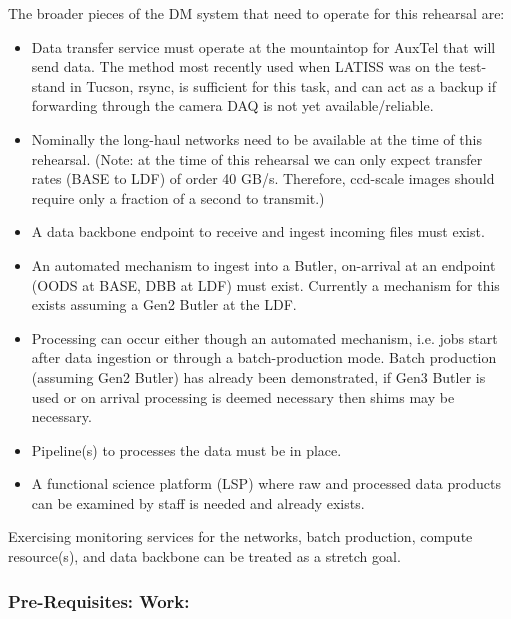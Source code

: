 The broader pieces of the DM system that need to operate for this rehearsal are:
\begin{itemize}[topsep=-8pt]
\item Data transfer service must operate at the mountaintop for AuxTel that will send data.
The method most recently used when LATISS was on the test-stand in Tucson, rsync, is 
sufficient for this task, and can act as a backup if forwarding through the camera DAQ is 
not yet available/reliable.

\item  Nominally the long-haul networks need to be available at the time of this rehearsal.
(Note: at the time of this rehearsal we can only expect transfer rates (BASE to LDF)
of order 40 GB/s.  Therefore, ccd-scale images should require only a fraction of a second to 
transmit.)

\item A data backbone endpoint to receive and ingest incoming files must exist.

\item An automated mechanism to ingest into a Butler, on-arrival at an endpoint (OODS at BASE, DBB at LDF)
must exist.  Currently a mechanism for this exists assuming a Gen2 Butler at the LDF.

\item Processing can occur either though an automated mechanism, i.e. jobs start after data ingestion
or through a batch-production mode.  Batch production (assuming Gen2 Butler) has already been demonstrated,
if Gen3 Butler is used or on arrival processing is deemed necessary then shims may be necessary.

\item Pipeline(s) to processes the data must be in place.

\item A functional science platform (LSP) where raw and processed data products can be 
examined by staff is needed and already exists.
\end{itemize}

Exercising monitoring services for the networks, batch production, compute 
resource(s), and data backbone can be treated as a stretch goal.


\subsubsection{Pre-Requisites: Work:}\label{prework}

